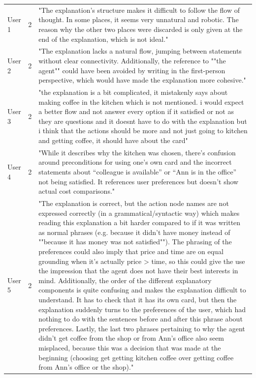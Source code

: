 \documentclass[sigconf,nonacm]{acmart}
\begin{document}
\begin{longtable}{l|l|p{15cm}}
        User 1 & 2 & "The explanation's structure makes it difficult to follow the flow of thought. In some places, it seems very unnatural and robotic. The reason why the other two places were discarded is only given at the end of the explanation, which is not ideal."  \\
        User 2 & 2 & "The explanation lacks a natural flow, jumping between statements without clear connectivity.
Additionally, the reference to ""the agent"" could have been avoided by writing in the first-person perspective,
which would have made the explanation more cohesive." \\
        User 3 & 2 & "the explanation is a bit complicated, it mistakenly says about making coffee in the kitchen which is not
mentioned. i would expect a better flow and not answer every option if it satisfied or not as they are questions
and it doesnt have to do with the explanation but i think that the actions should be more and not just going to
kitchen and getting coffee, it should have about the card" \\
        User 4 & 2 & "While it describes why the kitchen was chosen, there’s confusion around preconditions for using
one’s own card and the incorrect statements about “colleague is available” or “Ann is in the office” not being
satisfied. It references user preferences but doesn’t show actual cost comparisons." \\
        User 5 & 2 & "The explanation is correct, but the action node names are not expressed correctly (in a grammatical/syntactic
way) which makes reading this explanation a bit harder compared to if it was written as normal phrases (e.g.
because it didn't have money instead of ""because it has money was not satisfied""). The phrasing of the
preferences could also imply that price and time are on equal grounding when it's actually price > time, so this
could give the use the impression that the agent does not have their best interests in mind. Additionally, the
order of the different explanatory components is quite confusing and makes the explanation difficult to
understand. It has to check that it has its own card, but then the explanation suddenly turns to the preferences
of the user, which had nothing to do with the sentences before and after this phrase about preferences. Lastly,
the last two phrases pertaining to why the agent didn't get coffee from the shop or from Ann's office also seem
misplaced, because this was a decision that was made at the beginning (choosing get getting kitchen coffee
over getting coffee from Ann's office or the shop)." \\
        \midrule


\end{longtable}
\end{document}
